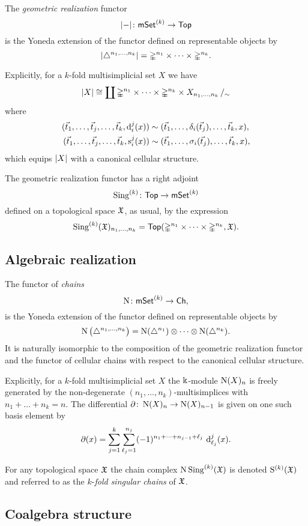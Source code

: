 The \textit{geometric realization} functor
\[
\lvert-\rvert \colon \mathsf{mSet}^{(k)} \to \mathsf{Top}
\]
is the Yoneda extension of the functor defined on representable objects by
\[
\lvert\triangle^{n_1,\dots,n_k}\rvert = \mathbb{\Delta}^{n_1}\times\dots\times\mathbb{\Delta}^{n_k}.
\]

Explicitly, for a $k$-fold multisimplicial set $X$ we have
\[
\lvert X\rvert \cong
\coprod \mathbb{\Delta}^{n_1}\times\dots\times\mathbb{\Delta}^{n_k} \times X_{n_1,\dots,n_k} \, /_\sim
\]
where
\[
\begin{split}
	(\vec{t}_1, \dots, \vec{t}_j, \dots, \vec{t}_k, \operatorname{d}^j_i(x)) &\sim (\vec{t}_1, \dots, \delta_i(\vec{t}_j), \dots, \vec{t}_k, x), \\
	(\vec{t}_1, \dots, \vec{t}_j, \dots, \vec{t}_k, \operatorname{s}^j_i(x)) &\sim (\vec{t}_1, \dots, \sigma_i(\vec{t}_j), \dots, \vec{t}_k, x),
\end{split}
\]
which equips $\lvert X\rvert$ with a canonical cellular structure.

The geometric realization functor has a right adjoint
\[
\operatorname{Sing}^{(k)} \colon \mathsf{Top} \to \mathsf{mSet}^{(k)}
\]
defined on a topological space $\mathfrak{X}$, as usual, by the expression
\[
\operatorname{Sing}^{(k)}(\mathfrak{X})_{n_1,\dots,n_k} =
\mathsf{Top}(\mathbb{\Delta}^{n_1}\times\dots\times\mathbb{\Delta}^{n_k},\mathfrak{X}).
\]

\subsection{Algebraic realization}\label{ss:algebraic realization}

The functor of \textit{chains}
\[
\operatorname{N} \colon \mathsf{mSet}^{(k)} \to \mathsf{Ch},
\]
is the Yoneda extension of the functor defined on representable objects by
\[
\operatorname{N} \big( \triangle^{n_1, \dots, n_k} \big) =
\operatorname{N}(\triangle^{n_1}) \otimes \dotsb \otimes \operatorname{N}(\triangle^{n_k}).
\]
It is naturally isomorphic to the composition of the geometric realization functor and the functor of cellular chains with respect to the canonical cellular structure.

Explicitly, for a $k$-fold multisimplicial set $X$ the $\Bbbk$-module $\operatorname{N}(X)_n$ is freely generated by the non-degenerate $(n_1, \dots, n_k)$-multisimplices with $n_1+\dots+n_k = n$.
The differential $\operatorname{\partial} \colon \operatorname{N}(X)_n \to \operatorname{N}(X)_{n-1}$ is given on one such basis element by
\[
\operatorname{\partial}(x) = \sum_{j=1}^k \sum_{\ell_j=1}^{n_j}
(-1)^{n_{1}+\dots+n_{j-1}+\ell_j} \, \operatorname{d}^j_{\ell_j}(x).
\]

For any topological space $\mathfrak{X}$ the chain complex $\operatorname{N}\operatorname{Sing}^{(k)}(\mathfrak{X})$ is denoted $\mathrm{S}^{(k)}(\mathfrak{X})$ and referred to as the $k$-\textit{fold singular chains} of $\mathfrak{X}$.

\subsection{Coalgebra structure}\label{ss:coalgebra}

